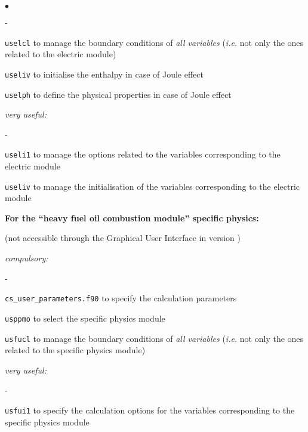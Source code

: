 {{{\begin{list}{$\bullet$}{}
\begin{list}{}{}
\begin{list}{}{}
\begin{list}{-}{}
            \item \texttt{uselcl} to manage the boundary conditions of {\em all
              variables} ({\em i.e.} not only
              the ones related to the electric module)

            \item \texttt{useliv} to initialise the enthalpy in
                  case of Joule effect

            \item \texttt{uselph} to define the physical
                  properties in case of Joule effect
        \end{list}

        \item {\em very useful:}
        \begin{list}{-}{}
            \item  \texttt{useli1} to manage the options related
                   to the variables corresponding to the electric module

            \item   \texttt{useliv} to manage the initialisation of the
                   variables corresponding to the electric module
        \end{list}
    \end{list}

     \item{\bf For the ``heavy fuel oil combustion module'' specific physics:}

(not accessible through the Graphical User Interface in version \verscs)
    \begin{list}{}{}
        \item {\em compulsory:}
        \begin{list}{-}{}
            \item \texttt{cs\_user\_parameters.f90} to specify the calculation parameters

            \item \texttt{usppmo} to select the specific physics module

            \item \texttt{usfucl} to manage the
                  boundary conditions of {\em all variables} ({\em i.e.} not only
              the ones related to the specific physics module)
        \end{list}

        \item {\em very useful:}
        \begin{list}{-}{}
            \item  \texttt{usfui1}
               to specify the calculation options
                   for the variables
                   corresponding to the specific physics module


\end{list}
\end{list}
\end{list}
\end{list}}}}
